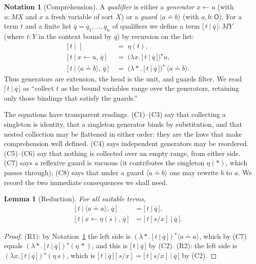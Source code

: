 \documentclass[11pt]{article}
\theoremstyle{definition}
\newtheorem{notation}[definition]{Notation}
\theoremstyle{plain}
\newtheorem{lemma}[definition]{Lemma}
\newcommand{\Ob}{\mathsf{O}}            %
\newcommand{\M}{M}                      %
\newcommand{\unit}{\eta}                %
\newcommand{\guard}[1]{\langle #1\rangle}
\newcommand{\eq}{\mathrel{\doteq}}      %
\newcommand{\gen}[2]{#1\!\leftarrow\!#2}%
\newcommand{\pt}{\ast}                  %
\newcommand{\compr}[2]{\bigl[\,#1 \ \big|\ #2\,\bigr]}
\begin{document}
\begin{notation}[Comprehension]\label{not:comp}
A \emph{qualifier} is either a \emph{generator} $\gen{x}{u}$ (with
$u\colon\M X$ and $x$ a fresh variable of sort $X$) or a \emph{guard}
$\guard{a\eq b}$ (with $a,b\colon\Ob$). For a term $t$ and a finite list
$\overline{q}=q_1,\dots,q_n$ of qualifiers we define a term
$\compr{t}{\overline{q}}\colon\M Y$ (where $t\colon Y$ in the context bound by
$\overline{q}$) by recursion on the list:
\begin{align*}
  \compr{t}{\,} &\;=\; \unit(t),\\
  \compr{t}{\gen{x}{u},\,\overline{q}}
    &\;=\; \bigl(\lambda x.\,\compr{t}{\overline{q}}\bigr)^{\!\star} u,\\
  \compr{t}{\guard{a\eq b},\,\overline{q}}
    &\;=\; \bigl(\lambda \pt.\,\compr{t}{\overline{q}}\bigr)^{\!\star}\,
           \guard{a\eq b}.
\end{align*}
Thus generators are extension, the head is the unit, and guards filter. We read
$\compr{t}{\overline q}$ as ``collect $t$ as the bound variables range over the
generators, retaining only those bindings that satisfy the guards.''
\end{notation}

The equations have transparent readings. (C1)--(C3) say that collecting a
singleton is identity, that a singleton generator binds by substitution, and
that nested collection may be flattened in either order: they are the laws that
make comprehension well defined. (C4) says independent generators may be
reordered. (C5)--(C6) say that nothing is collected over an empty range, from
either side. (C7) says a reflexive guard is vacuous (it contributes the
singleton $\unit(\pt)$, which passes through); (C8) says that under a guard
$\guard{a\eq b}$ one may rewrite $b$ to $a$. We record the two immediate
consequences we shall need.

\begin{lemma}[Reduction]\label{lem:reduce}
For all suitable terms,
\begin{align}
  \compr{t}{\guard{a\eq a},\,\overline q}
    &= \compr{t}{\overline q}, \tag{R1}\label{eq:R1}\\
  \compr{t}{\gen{x}{\unit(s)},\,\overline q}
    &= \compr{t[s/x]}{\overline q}. \tag{R2}\label{eq:R2}
\end{align}
\end{lemma}
\begin{proof}
(R1): by Notation~\ref{not:comp} the left side is
$(\lambda\pt.\,\compr{t}{\overline q})^{\star}\guard{a\eq a}$, which by (C7)
equals $(\lambda\pt.\,\compr{t}{\overline q})^{\star}(\unit\,\pt)$, and this is
$\compr{t}{\overline q}$ by (C2). (R2): the left side is
$(\lambda x.\,\compr{t}{\overline q})^{\star}(\unit\,s)$, which is
$\compr{t}{\overline q}[s/x]=\compr{t[s/x]}{\overline q}$ by (C2).
\end{proof}
\end{document}
